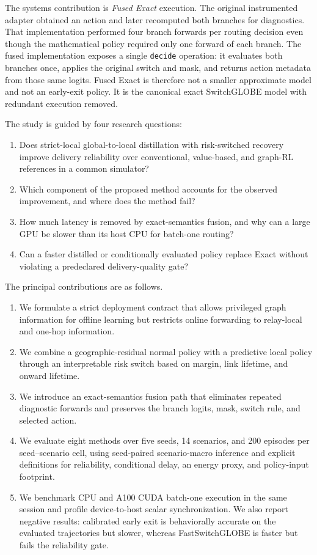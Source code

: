\documentclass[drones,article,submit,moreauthors]{Definitions/mdpi}
\newcommand{\SG}{SwitchGLOBE}
\newcommand{\FastSG}{FastSwitchGLOBE}
\begin{document}
The systems contribution is \emph{Fused Exact} execution. The original instrumented adapter obtained an action and later recomputed both branches for diagnostics. That implementation performed four branch forwards per routing decision even though the mathematical policy required only one forward of each branch. The fused implementation exposes a single \texttt{decide} operation: it evaluates both branches once, applies the original switch and mask, and returns action metadata from those same logits. Fused Exact is therefore not a smaller approximate model and not an early-exit policy. It is the canonical exact \SG{} model with redundant execution removed.

The study is guided by four research questions:
\begin{enumerate}[leftmargin=*]
\item Does strict-local global-to-local distillation with risk-switched recovery improve delivery reliability over conventional, value-based, and graph-RL references in a common simulator?
\item Which component of the proposed method accounts for the observed improvement, and where does the method fail?
\item How much latency is removed by exact-semantics fusion, and why can a large GPU be slower than its host CPU for batch-one routing?
\item Can a faster distilled or conditionally evaluated policy replace Exact without violating a predeclared delivery-quality gate?
\end{enumerate}

The principal contributions are as follows.
\begin{enumerate}[leftmargin=*]
\item We formulate a strict deployment contract that allows privileged graph information for offline learning but restricts online forwarding to relay-local and one-hop information.
\item We combine a geographic-residual normal policy with a predictive local policy through an interpretable risk switch based on margin, link lifetime, and onward lifetime.
\item We introduce an exact-semantics fusion path that eliminates repeated diagnostic forwards and preserves the branch logits, mask, switch rule, and selected action.
\item We evaluate eight methods over five seeds, 14 scenarios, and 200 episodes per seed--scenario cell, using seed-paired scenario-macro inference and explicit definitions for reliability, conditional delay, an energy proxy, and policy-input footprint.
\item We benchmark CPU and A100 CUDA batch-one execution in the same session and profile device-to-host scalar synchronization. We also report negative results: calibrated early exit is behaviorally accurate on the evaluated trajectories but slower, whereas \FastSG{} is faster but fails the reliability gate.
\end{enumerate}
\end{document}
